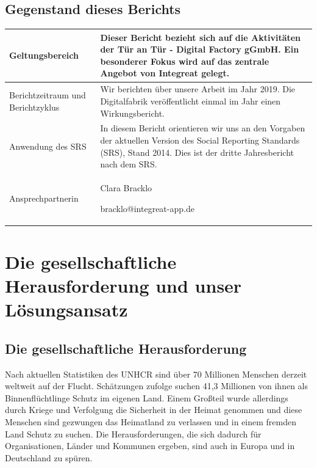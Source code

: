 \documentclass[12pt, a4paper]{article} %
\begin{document}
\hypertarget{gegenstand-dieses-berichts}{%
\subsection{Gegenstand dieses Berichts}\label{gegenstand-dieses-berichts}}

\noindent\begin{tabularx}{\textwidth}{p{4cm}X}
  \toprule
  Geltungsbereich & Dieser Bericht bezieht sich auf die Aktivitäten der
  Tür an Tür - Digital Factory gGmbH. Ein besonderer Fokus wird auf das
  zentrale Angebot von Integreat gelegt.\tabularnewline
  \midrule
  Berichtzeitraum und Berichtzyklus & Wir berichten über unsere Arbeit im
  Jahr 2019. Die Digitalfabrik veröffentlicht einmal im Jahr einen
  Wirkungsbericht.\tabularnewline
  \midrule
  Anwendung des SRS & In diesem Bericht orientieren wir uns an den
  Vorgaben der aktuellen Version des Social Reporting Standards (SRS),
  Stand 2014. Dies ist der dritte Jahresbericht nach dem
  SRS.\tabularnewline
  \midrule
  Ansprechpartnerin & \begin{minipage}[t]{\columnwidth}
  Clara Bracklo
  
  bracklo@integreat-app.de\end{minipage}\tabularnewline
  
  \bottomrule
\end{tabularx}

\hypertarget{die-gesellschaftliche-herausforderung-und-unser-luxf6sungsansatz}{%
\section{Die gesellschaftliche Herausforderung und unser
Lösungsansatz}\label{die-gesellschaftliche-herausforderung-und-unser-luxf6sungsansatz}}

\hypertarget{die-gesellschaftliche-herausforderung}{%
\subsection{Die gesellschaftliche
Herausforderung}\label{die-gesellschaftliche-herausforderung}}

Nach aktuellen Statistiken des UNHCR sind über 70 Millionen Menschen
derzeit weltweit auf der Flucht. Schätzungen zufolge suchen 41,3
Millionen von ihnen als Binnenflüchtlinge Schutz im eigenen Land. Einem
Großteil wurde allerdings durch Kriege und Verfolgung die Sicherheit in
der Heimat genommen und diese Menschen sind gezwungen das Heimatland zu
verlassen und in einem fremden Land Schutz zu suchen. Die
Herausforderungen, die sich dadurch für Organisationen, Länder und
Kommunen ergeben, sind auch in Europa und in Deutschland zu spüren.
\end{document}
